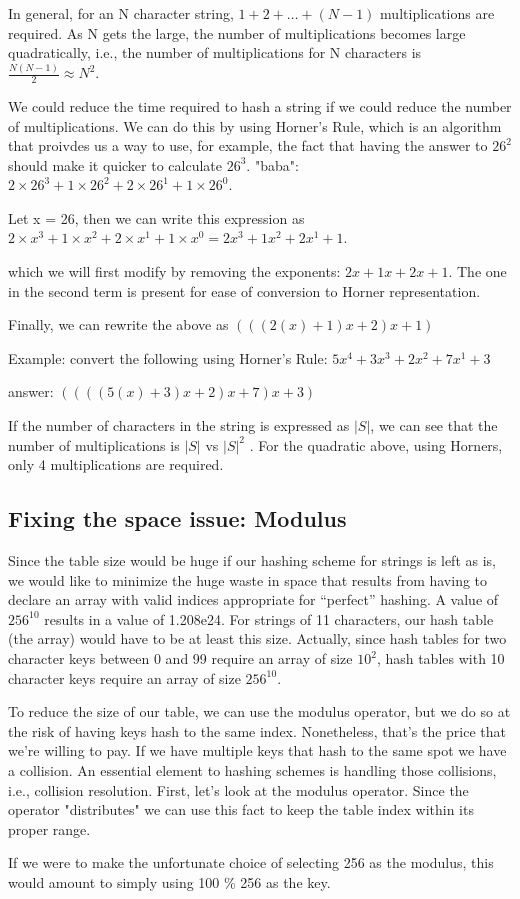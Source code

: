 \documentclass[12pt]{article} %
\begin{document}
In general, for an N character string, $1 + 2 + \ldots + (N-1)$ multiplications are required.  As N gets the large, the number of multiplications becomes large quadratically, i.e., the number of multiplications for N characters is
 $\frac{N(N-1)}{2}  \approx  N^2$.

We could reduce the time required to hash a string if we could reduce the number of multiplications.  We can do this by using Horner's Rule, which is an algorithm that proivdes us a way to use, for example, the fact that having the answer to $26^2$ should make it quicker to calculate $26^3$.
"baba": $2 \times 26^3 + 1 \times 26^2 + 2 \times 26^1 + 1 \times 26^0 $.

Let x = 26, then we can write  this expression as
$2 \times x^3 + 1 \times x^2 + 2 \times x^1 + 1 \times x^0 =2 x^3 + 1  x^2 + 2  x^1 + 1 $. 
 
which we will first modify by removing the exponents:
$2  x + 1  x + 2  x + 1 $.  The one  in the second term is present for ease of conversion to Horner representation.

Finally, we can rewrite the above as $(((2( x ) + 1) x  + 2 ) x + 1 )$

Example:  convert the following using Horner's Rule:
$5 x^4 + 3  x^3 + 2  x^2 + 7x^1 + 3 $


answer: $((((5 (x) + 3)  x+ 2)  x + 7)x + 3) $


If the number of characters in the string is expressed as $| S |$, we can see that the number of multiplications is $ |S|$  vs $ |S|^2$ .  For the quadratic above, using Horners, only 4 multiplications are required.



 \subsection{Fixing the space issue: Modulus}
Since the table size would be huge if our hashing scheme for strings is left as is, we would like to minimize the huge waste in space that results from having to declare an array with valid indices appropriate for ``perfect'' hashing.  A value of $256^10$ results in a value of 1.208e24.  For strings of 11 characters, our hash table (the array) would have to be at least this size.  Actually, since hash tables for two character keys between 0 and 99 require an array of size $10^2$, hash tables with 10 character keys require an array of size $256^10$.
 
To reduce the size of our table, we can use the modulus operator, but we do so at the risk of having keys hash to the same index.  Nonetheless, that's the price that we're willing to pay.  If we have multiple keys that hash to the same spot we have a collision.  An essential element to hashing schemes is handling those collisions, i.e., collision resolution.  First, let's look at the modulus operator.  Since the operator "distributes" we can use this fact to keep the table index within its proper range.

If we were to make the unfortunate choice of selecting 256 as the modulus, this would amount to simply using 100 \% 256 as the key.
\end{document}
